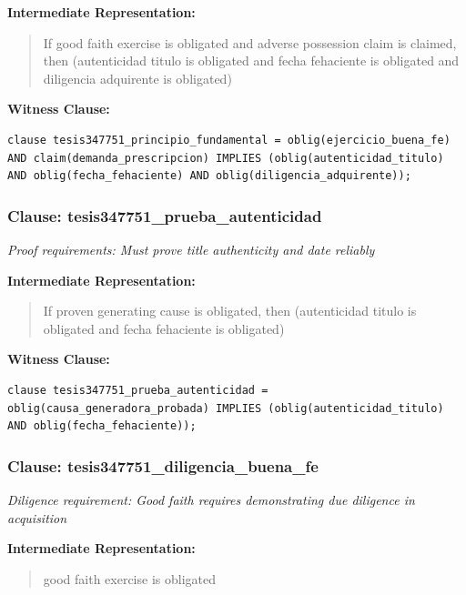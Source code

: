 \documentclass[11pt,a4paper]{article}
\begin{document}
\textbf{Intermediate Representation:}

\begin{quote}
If good faith exercise is obligated and adverse possession claim is claimed, then (autenticidad titulo is obligated and fecha fehaciente is obligated and diligencia adquirente is obligated)
\end{quote}

\textbf{Witness Clause:}

\begin{lstlisting}[style=witnessstyle, language=Witness]
clause tesis347751_principio_fundamental = oblig(ejercicio_buena_fe) AND claim(demanda_prescripcion) IMPLIES (oblig(autenticidad_titulo) AND oblig(fecha_fehaciente) AND oblig(diligencia_adquirente));
\end{lstlisting}

\subsubsection{Clause: tesis347751\_prueba\_autenticidad}

\textit{Proof requirements: Must prove title authenticity and date reliably}

\textbf{Intermediate Representation:}

\begin{quote}
If proven generating cause is obligated, then (autenticidad titulo is obligated and fecha fehaciente is obligated)
\end{quote}

\textbf{Witness Clause:}

\begin{lstlisting}[style=witnessstyle, language=Witness]
clause tesis347751_prueba_autenticidad = oblig(causa_generadora_probada) IMPLIES (oblig(autenticidad_titulo) AND oblig(fecha_fehaciente));
\end{lstlisting}

\subsubsection{Clause: tesis347751\_diligencia\_buena\_fe}

\textit{Diligence requirement: Good faith requires demonstrating due diligence in acquisition}

\textbf{Intermediate Representation:}

\begin{quote}
good faith exercise is obligated
\end{quote}
\end{document}
